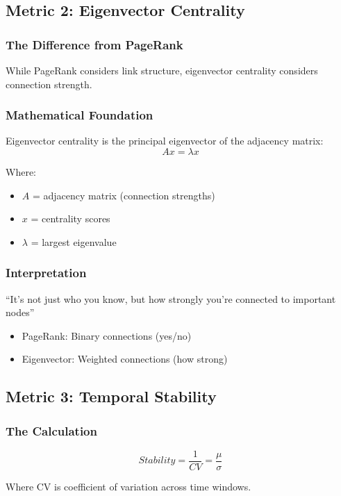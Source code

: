 \documentclass[11pt]{article}
\begin{document}
\subsection{Metric 2: Eigenvector Centrality}

\subsubsection{The Difference from PageRank}
While PageRank considers link structure, eigenvector centrality considers connection strength.

\subsubsection{Mathematical Foundation}

Eigenvector centrality is the principal eigenvector of the adjacency matrix:
\[Ax = \lambda x\]

Where:
\begin{itemize}
    \item $A$ = adjacency matrix (connection strengths)
    \item $x$ = centrality scores
    \item $\lambda$ = largest eigenvalue
\end{itemize}

\subsubsection{Interpretation}
``It's not just who you know, but how strongly you're connected to important nodes''

\begin{itemize}
    \item PageRank: Binary connections (yes/no)
    \item Eigenvector: Weighted connections (how strong)
\end{itemize}

\subsection{Metric 3: Temporal Stability}

\subsubsection{The Calculation}
\[Stability = \frac{1}{CV} = \frac{\mu}{\sigma}\]

Where CV is coefficient of variation across time windows.
\end{document}
